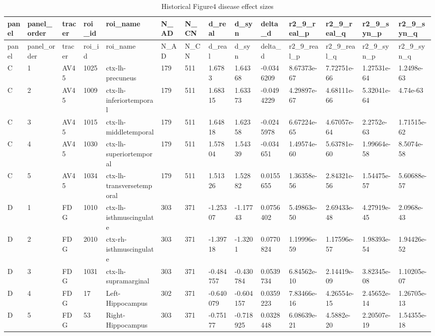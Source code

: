 \begin{landscape}
\begingroup
\footnotesize
\setlength{\tabcolsep}{4pt}
\begin{longtable}{llllllllllllll}
\caption{Historical Figure4 disease effect sizes}\label{tab:s-n10}\\
\toprule
panel & panel\_order & tracer & roi\_id & roi\_name & N\_AD & N\_CN & d\_real & d\_syn & delta\_d & r2\_9\_real\_p & r2\_9\_real\_q & r2\_9\_syn\_p & r2\_9\_syn\_q \\
\midrule
\endfirsthead
\toprule
panel & panel\_order & tracer & roi\_id & roi\_name & N\_AD & N\_CN & d\_real & d\_syn & delta\_d & r2\_9\_real\_p & r2\_9\_real\_q & r2\_9\_syn\_p & r2\_9\_syn\_q \\
\midrule
\endhead
\bottomrule
\endfoot
C & 1 & AV45 & 1025 & ctx-lh-precuneus & 179 & 511 & 1.6783 & 1.64368 & -0.0346209 & 8.67373e-67 & 7.72751e-66 & 1.27531e-64 & 1.2498e-63 \\
C & 2 & AV45 & 1009 & ctx-lh-inferiortemporal & 179 & 511 & 1.68315 & 1.63373 & -0.0494229 & 4.29897e-67 & 4.68111e-66 & 5.32041e-64 & 4.74e-63 \\
C & 3 & AV45 & 1015 & ctx-lh-middletemporal & 179 & 511 & 1.64818 & 1.62358 & -0.0245978 & 6.67224e-65 & 4.67057e-64 & 2.2752e-63 & 1.71515e-62 \\
C & 4 & AV45 & 1030 & ctx-lh-superiortemporal & 179 & 511 & 1.57804 & 1.54339 & -0.034651 & 1.49574e-60 & 5.63781e-60 & 1.99664e-58 & 8.5074e-58 \\
C & 5 & AV45 & 1034 & ctx-lh-transversetemporal & 179 & 511 & 1.51326 & 1.52882 & 0.0155655 & 1.36358e-56 & 2.84321e-56 & 1.54475e-57 & 5.60688e-57 \\
D & 1 & FDG & 1010 & ctx-lh-isthmuscingulate & 303 & 371 & -1.25307 & -1.17743 & 0.0756402 & 5.49863e-50 & 2.69433e-48 & 4.27919e-45 & 2.0968e-43 \\
D & 2 & FDG & 2010 & ctx-rh-isthmuscingulate & 303 & 371 & -1.39718 & -1.3201 & 0.0770824 & 1.19996e-59 & 1.17596e-57 & 1.98393e-54 & 1.94426e-52 \\
D & 3 & FDG & 1031 & ctx-lh-supramarginal & 303 & 371 & -0.484757 & -0.430784 & 0.0539734 & 6.84562e-10 & 2.14419e-09 & 3.82345e-08 & 1.10205e-07 \\
D & 4 & FDG & 17 & Left-Hippocampus & 302 & 371 & -0.640079 & -0.604157 & 0.0359223 & 7.83466e-16 & 4.26554e-15 & 2.45652e-14 & 1.26705e-13 \\
D & 5 & FDG & 53 & Right-Hippocampus & 303 & 371 & -0.75177 & -0.718925 & 0.0328448 & 6.08639e-21 & 4.5882e-20 & 2.20507e-19 & 1.54355e-18 \\

\end{longtable}
\end{landscape}
